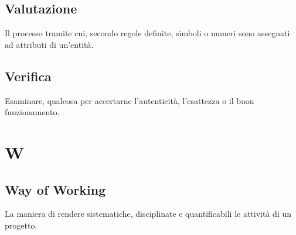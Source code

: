 	\subsection{Valutazione} 
	Il processo tramite cui, secondo regole definite, simboli o numeri sono assegnati ad attributi di un’entità.
	\subsection{Verifica}
	Esaminare, qualcosa per accertarne l’autenticità, l’esattezza o il buon funzionamento.
	
	\section{W}
	
	\subsection{Way of Working} 
	La maniera di rendere sistematiche, disciplinate e quantificabili le attività di un progetto.
	

